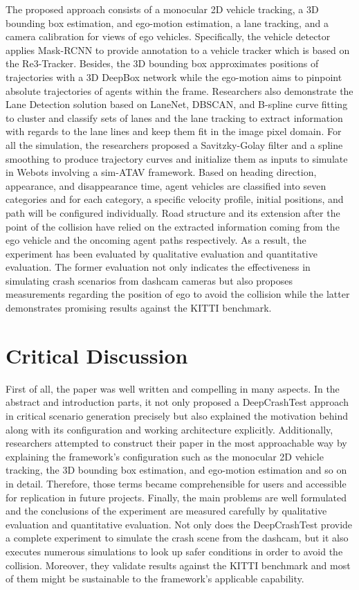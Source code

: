\documentclass[10pt,a4paper]{report}
\begin{document}
The proposed approach consists of a monocular 2D vehicle tracking, a 3D bounding box estimation, and ego-motion estimation, a lane tracking, and a camera calibration for views of ego vehicles.
%
Specifically, the vehicle detector applies Mask-RCNN to provide annotation to a vehicle tracker which is based on the Re3-Tracker. 
%
Besides, the 3D bounding box approximates positions of trajectories with a 3D DeepBox network while the ego-motion aims to pinpoint absolute trajectories of agents within the frame.
%
Researchers also demonstrate the Lane Detection solution based on LaneNet, DBSCAN, and B-spline curve fitting to cluster and classify sets of lanes and the lane tracking to extract information with regards to the lane lines and keep them fit in the image pixel domain.
%
For all the simulation, the researchers proposed a Savitzky-Golay filter and a spline smoothing to produce trajectory curves and initialize them as inputs to simulate in Webots involving a sim-ATAV framework.
%
Based on heading direction, appearance, and disappearance time, agent vehicles are classified into seven categories and for each category, a specific velocity profile, initial positions, and path will be configured individually.
%
Road structure and its extension after the point of the collision have relied on the extracted information coming from the ego vehicle and the oncoming agent paths respectively.
%
As a result, the experiment has been evaluated by qualitative evaluation and quantitative evaluation.
%
The former evaluation not only indicates the effectiveness in simulating crash scenarios from dashcam cameras but also proposes measurements regarding the position of ego to avoid the collision
%
while the latter demonstrates promising results against the KITTI benchmark.

\section{Critical Discussion}
First of all, the paper was well written and compelling in many aspects. In the abstract and introduction parts, it not only proposed a DeepCrashTest approach in critical scenario generation precisely but also explained the motivation behind along with its configuration and working architecture explicitly.
%
Additionally, researchers attempted to construct their paper in the most approachable way by explaining the framework's configuration such as the monocular 2D vehicle tracking, the 3D bounding box estimation, and ego-motion estimation and so on in detail.
%
Therefore, those terms became comprehensible for users and accessible for replication in future projects.
%
Finally, the main problems are well formulated and the conclusions of the experiment are measured carefully by qualitative evaluation and quantitative evaluation. 
%
Not only does the DeepCrashTest provide a complete experiment to simulate the crash scene from the dashcam, but it also executes numerous simulations to look up safer conditions in order to avoid the collision.
%
Moreover, they validate results against the KITTI benchmark and most of them might be sustainable to the framework's applicable capability.
%
\end{document}
